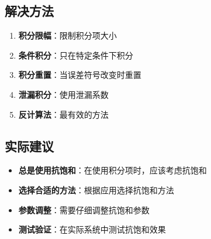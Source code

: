 \documentclass[12pt,a4paper]{article}
\begin{document}
\subsection{解决方法}

\begin{enumerate}
\item \textbf{积分限幅}：限制积分项大小
\item \textbf{条件积分}：只在特定条件下积分
\item \textbf{积分重置}：当误差符号改变时重置
\item \textbf{泄漏积分}：使用泄漏系数
\item \textbf{反计算法}：最有效的方法
\end{enumerate}

\subsection{实际建议}

\begin{itemize}
\item \textbf{总是使用抗饱和}：在使用积分项时，应该考虑抗饱和
\item \textbf{选择合适的方法}：根据应用选择抗饱和方法
\item \textbf{参数调整}：需要仔细调整抗饱和参数
\item \textbf{测试验证}：在实际系统中测试抗饱和效果
\end{itemize}
\end{document}
